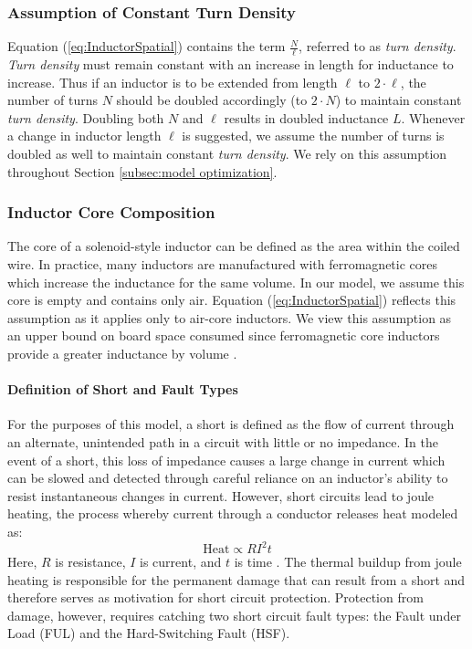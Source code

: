 \subsubsection{Assumption of Constant Turn Density} \label{ssec:Assumption of Constant}
Equation (\ref{eq:InductorSpatial}) contains the term $\frac{N}{\ell}$, referred to as \textit{turn density}.
\textit{Turn density} must remain constant with an increase in length for inductance to increase.
Thus if an inductor is to be extended from length $\ell$ to $2\cdot \ell$, the number of turns $N$ should be doubled accordingly (to $2\cdot N$) to maintain constant \textit{turn density}.
Doubling both $N$ and $\ell$ results in doubled inductance $L$.
Whenever a change in inductor length $\ell$ is suggested, we assume the number of turns is doubled as well to maintain constant \textit{turn density}.
We rely on this assumption throughout Section \ref{subsec:model optimization}.
\subsubsection{Inductor Core Composition}
The core of a solenoid-style inductor can be defined as the area within the coiled wire.
In practice, many inductors are manufactured with ferromagnetic cores which increase the inductance for the same volume.
In our model, we assume this core is empty and contains only air.
Equation (\ref{eq:InductorSpatial}) reflects this assumption as it applies only to air-core inductors.
We view this assumption as an upper bound on board space consumed since ferromagnetic core inductors provide a greater inductance by volume \cite{gao_fabrication_2006}.

\paragraph{Definition of Short and Fault Types}
For the purposes of this model, a short is defined as the flow of current through an alternate, unintended path in a circuit with little or no impedance.
In the event of a short, this loss of impedance causes a large change in current which can be slowed and detected through careful reliance on an inductor's ability to resist instantaneous changes in current.
However, short circuits lead to joule heating, the process whereby current through a conductor releases heat modeled as:
\begin{equation}\label{eq:JouleHeating}
\text{Heat} \propto R I^{2} t
\end{equation}
Here, $R$ is resistance, $I$ is current, and $t$ is time \cite{young_sears_2012}.
The thermal buildup from joule heating is responsible for the permanent damage that can result from a short and therefore serves as motivation for short circuit protection.
Protection from damage, however, requires catching two short circuit fault types: the Fault under Load (FUL) and the Hard-Switching Fault (HSF).

